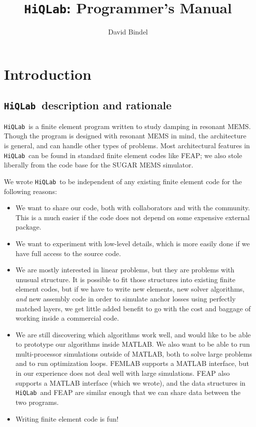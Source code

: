 \documentclass{article}
\newcommand{\hiq}{\texttt{HiQLab}}
\begin{document}
\title{\hiq: Programmer's Manual}
\author{David Bindel}

\maketitle
\tableofcontents


\section{Introduction}

\subsection{\hiq\ description and rationale}

\hiq\ is a finite element program written to study damping in resonant
MEMS.  Though the program is designed with resonant MEMS in mind, the
architecture is general, and can handle other types of problems.  Most
architectural features in \hiq\ can be found in standard finite
element codes like FEAP; we also stole liberally from the code base
for the SUGAR MEMS simulator.

We wrote \hiq\ to be independent of any existing finite element code
for the following reasons:
\begin{itemize}

  \item We want to share our code, both with collaborators and with
  the community.  This is a much easier if the code does not depend on
  some expensive external package.

  \item We want to experiment with low-level details, which is more
  easily done if we have full access to the source code.

  \item We are mostly interested in linear problems, but they are
  problems with unusual structure.  It is possible to fit those
  structures into existing finite element codes, but if we have to
  write new elements, new solver algorithms, \emph{and} new assembly
  code in order to simulate anchor losses using perfectly matched
  layers, we get little added benefit to go with the cost and baggage
  of working inside a commercial code.

  \item We are still discovering which algorithms work well, and would
  like to be able to prototype our algorithms inside MATLAB.  We also
  want to be able to run multi-processor simulations outside of
  MATLAB, both to solve large problems and to run optimization loops.
  FEMLAB supports a MATLAB interface, but in our experience does not
  deal well with large simulations.  FEAP also supports a MATLAB
  interface (which we wrote), and the data structures in \hiq\ and
  FEAP are similar enough that we can share data between the two
  programs.

  \item Writing finite element code is fun!

\end{itemize}
\end{document}
